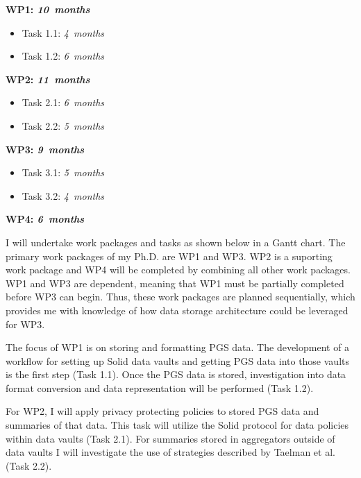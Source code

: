 \documentclass[a4paper,11pt]{article}
\begin{document}
\begin{refsection}
\begin{adjustwidth}{0cm}{0cm}
	\parindent 0pt
	\newcommand\duration[1]{\hfill\emph{#1~months}}
  
	\textbf{WP1:      \WPa  \duration{10}}
	\begin{itemize}
	  \item Task 1.1: \WPaa \duration{ 4}
	  \item Task 1.2: \WPab \duration{ 6}
	\end{itemize}
	\smallskip
  
	\textbf{WP2:      \WPb  \duration{11}}
	\begin{itemize}
	  \item Task 2.1: \WPba \duration{ 6}
	  \item Task 2.2: \WPbb \duration{ 5}
	\end{itemize}
	\smallskip
	
	\textbf{WP3:      \WPc  \duration{9}}
	\begin{itemize}
	  \item Task 3.1: \WPca \duration{ 5}
	  \item Task 3.2: \WPcb \duration{ 4}
	\end{itemize}
	\smallskip
	
	\textbf{WP4:      \WPd  \duration{ 6}}
\end{adjustwidth}

\noindent
I will undertake work packages and tasks as shown below in a Gantt chart.
The primary work packages of my Ph.D. are WP1 and WP3.
WP2 is a suporting work package and WP4 will be completed by combining all other work packages.
WP1 and WP3 are dependent, meaning that WP1 must be partially completed before WP3 can begin.
Thus, these work packages are planned sequentially, which provides me with knowledge of how data storage architecture could be leveraged for WP3.

The focus of WP1 is on storing and formatting PGS data.
The development of a workflow for setting up Solid data vaults and getting PGS data into those vaults is the first step (Task 1.1).
Once the PGS data is stored, investigation into data format conversion and data representation will be performed (Task 1.2).

For WP2, I will apply privacy protecting policies to stored PGS data and summaries of that data.
This task will utilize the Solid protocol for data policies within data vaults (Task 2.1).
For summaries stored in aggregators outside of data vaults I will investigate the use of strategies described by Taelman et al. (Task 2.2).


\end{refsection}
\end{document}
